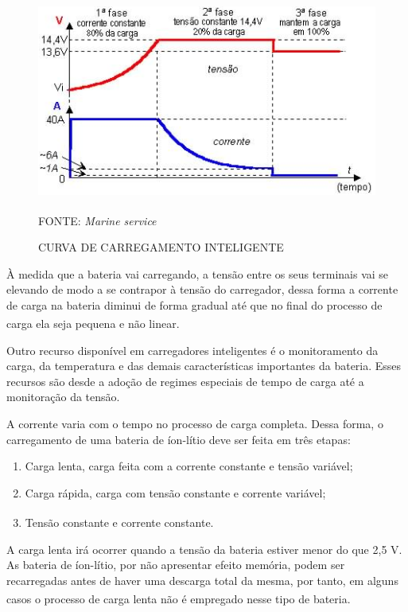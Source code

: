 \documentclass[
	12pt,				%
	openright,			%
	oneside,			%
	a4paper,			%
	english,			%
	french,				%
	spanish,			%
	brazil,				%
	oldfontcommands
	]{abntex2}
\begin{document}
	\begin{figure}[th]
		\caption{CURVA DE CARREGAMENTO INTELIGENTE}
		\label{Fig_Temp_Carg}
		\centering
		\includegraphics[width=0.67\linewidth]{./figs/temp_carg}
			
		\begin{small}
			FONTE: \textit{Marine service}\textsuperscript{\cite{marine}}
		\end{small}	
	\end{figure}
	\pagebreak

	À medida que a bateria vai carregando, a tensão entre os seus terminais vai se elevando de modo a se contrapor à tensão do carregador, dessa forma a corrente de carga na bateria diminui de forma gradual até que no final do processo de carga ela seja pequena e não linear.\textsuperscript{\cite{carregador}}
	
	Outro recurso disponível em carregadores inteligentes é o monitoramento da carga, da temperatura e das demais características importantes da bateria. Esses recursos são desde a adoção de regimes especiais de tempo de carga até a monitoração da tensão.

	A corrente varia com o tempo no processo de carga completa.	Dessa forma, o carregamento de uma bateria de íon-lítio deve ser feita em três etapas:
	
	\begin{enumerate}
		\item Carga lenta, carga feita com a corrente constante e tensão variável;
		\item Carga rápida, carga com tensão constante e corrente variável;
		\item Tensão constante e corrente constante.\textsuperscript{\cite{marine}}
	\end{enumerate}
	
	A carga lenta irá ocorrer quando a tensão da bateria estiver menor do que 2,5 V. As bateria de íon-lítio, por não apresentar efeito memória, podem ser recarregadas antes de haver uma descarga total da mesma, por tanto, em alguns casos o processo de carga lenta não é empregado nesse tipo de bateria.\textsuperscript{\cite{carregador}}
	
\end{document}
